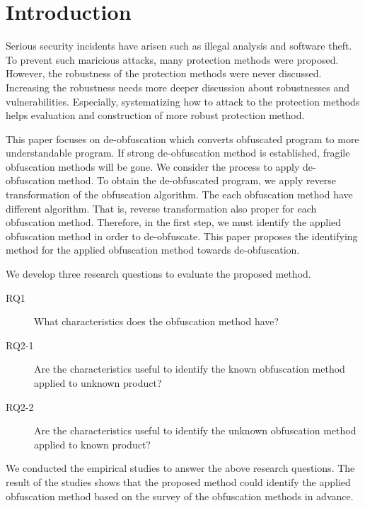 \documentclass[conference]{IEEEtran}
\begin{document}

%
\IEEEpeerreviewmaketitle

\section{Introduction}\label{sect:introduction}

Serious security incidents have arisen such as illegal analysis and
software theft.  To prevent such maricious attacks, many protection
methods were proposed.  However, the robustness of the protection
methods were never discussed.  Increasing the robustness needs more
deeper discussion about robustnesses and vulnerabilities.  Especially,
systematizing how to attack to the protection methods helps evaluation
and construction of more robust protection method.

This paper focuses on de-obfuscation which converts obfuscated program
to more understandable program.  If strong de-obfuscation method is
established, fragile obfuscation methods will be gone.
%
We consider the process to apply de-obfuscation method.
%
To obtain the de-obfuscated program, we apply reverse transformation
of the obfuscation algorithm.  The each obfuscation method have
different algorithm.  That is, reverse transformation also proper for
each obfuscation method.  Therefore, in the first step, we must
identify the applied obfuscation method in order to de-obfuscate.
This paper proposes the identifying method for the applied obfuscation
method towards de-obfuscation.

We develop three research questions to evaluate the proposed method.
\begin{description}
\item[RQ1]   What characteristics does the obfuscation method have?
\item[RQ2-1] Are the characteristics useful to identify the known
  obfuscation method applied to unknown product?
\item[RQ2-2] Are the characteristics useful to identify the unknown
  obfuscation method applied to known product?
\end{description}
We conducted the empirical studies to answer the above research
questions.  The result of the studies shows that the proposed method
could identify the applied obfuscation method based on the survey of
the obfuscation methods in advance.
\end{document}

